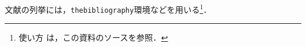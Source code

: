 \documentclass[11pt,dvipdfmx]{jreport}
\begin{document}
文献の列挙には，{\tt thebibliography}環境などを用いる\footnote{使い方
は，この資料のソースを参照．}．









% 
% 
% 

\end{document}
